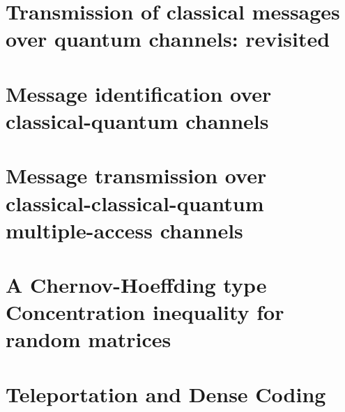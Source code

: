 \documentclass[a4paper, 11pt]{memoir}
\begin{document}
%  


\chapter{Transmission of classical messages over quantum channels: revisited}
\label{chap:channel_cod_rev}
 

\chapter{Message identification over classical-quantum channels}
\label{chap:cq_identification}
 


\chapter{Message transmission over classical-classical-quantum multiple-access channels}


\chapter{A Chernov-Hoeffding type Concentration inequality for random matrices}
\label{chap:hoeffding}
 



\chapter{Teleportation and Dense Coding}
\label{chap:telep_dense_cod}
 

\end{document}
